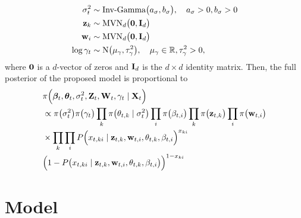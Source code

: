 \documentclass[a4paper, 11pt]{report}
\begin{document}
\begin{itemize}
\[\begin{split}
    \sigma_t^2 &\sim \mbox{Inv-Gamma}\big(a_{\sigma}, b_{\sigma}\big), \quad a_{\sigma} > 0, b_{\sigma} > 0 \\
    {\bf z}_k &\sim \mbox{MVN}_d\big({\bf 0}, {\bf I}_d\big)\\
    {\bf w}_i &\sim \mbox{MVN}_d\big({\bf 0}, {\bf I}_d\big)\\
    \log \gamma_t &\sim \mbox{N}\big(\mu_{\gamma}, \tau_{\gamma}^2\big), \quad \mu_{\gamma} \in \mathbb{R}, \tau_{\gamma}^2 > 0,
\end{split}\]
where ${\bf 0}$ is a $d$-vector of zeros and ${\bf I}_d$ is the $d \times d$ identity matrix. Then, the full posterior of the proposed model is proportional to 
\begin{equation}
\label{lsrm.likelihood}
\begin{split}
&\pi\Big(\boldsymbol\beta_t, \boldsymbol\theta_t, \sigma_t^2, {\bf Z}_t, {\bf W}_t, \gamma_t \mid {\bf X}_t\Big)\\
&\propto \pi\big(\sigma_t^2\big) \pi\big(\gamma_t\big) \prod_{k}\pi\big(\theta_{t,k} \mid \sigma_t^2\big) \prod_{i}\pi\big(\beta_{t,i}\big) \prod_{k}\pi\big({\bf z}_{t,k}\big) \prod_{i}\pi\big({\bf w}_{t,i}\big)\\
&\times \prod_k \prod_i P\Big(x_{t,ki} \mid {\bf z}_{t,k}, {\bf w}_{t,i}, \theta_{t,k}, \beta_{t,i}\Big)^{x_{ki}}\\
&\Big(1-P\big(x_{t,ki} \mid {\bf z}_{t,k}, {\bf w}_{t,i}, \theta_{t,k}, \beta_{t,i}\big)\Big)^{1-x_{ki}}
\end{split}
\end{equation}
\end{itemize}





\chapter{Model} \label{Chapter4}
\end{document}
